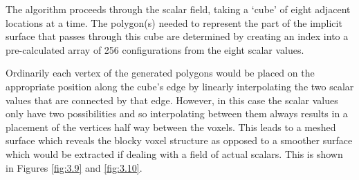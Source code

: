 The algorithm proceeds through the scalar field, taking a `cube' of eight adjacent locations at a time. The polygon(s) needed to represent the part of the implicit surface that passes through this cube are determined by creating an index into a pre-calculated array of 256 configurations from the eight scalar values.

Ordinarily each vertex of the generated polygons would be placed on the appropriate position along the cube's edge by linearly interpolating the two scalar values that are connected by that edge. However, in this case the scalar values only have two possibilities and so interpolating between them always results in a placement of the vertices half way between the voxels. This leads to a meshed surface which reveals the blocky voxel structure as opposed to a smoother surface which would be extracted if dealing with a field of actual scalars. This is shown in Figures \ref{fig:3.9} and \ref{fig:3.10}.

